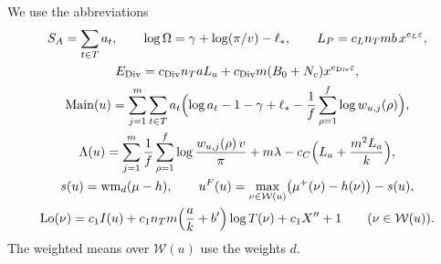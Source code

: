 \documentclass[11pt]{amsart}
\newcommand{\eps}{\varepsilon}
\theoremstyle{plain}
\theoremstyle{definition}
\numberwithin{equation}{section}
\begin{document}
We use the abbreviations
\begin{gather*}
S_A=\sum_{t\in T}a_t,\qquad \log\Omega=\gamma+\log(\pi/v)-\ell_\ast,\qquad
L_P=c_Ln_Tmb\,x^{e_L\eps},\\
E_{\mathrm{Div}}=c_{\mathrm{Div}}n_TaL_a+c_{\mathrm{Div}}m(B_0+N_c)x^{e_{\mathrm{Div}}\eps},\\
\mathrm{Main}(u)=\sum_{j=1}^m\sum_{t\in T}a_t\Bigl(\log a_t-1-\gamma+\ell_\ast-\frac1f\sum_{\rho=1}^f\log w_{u,j}(\rho)\Bigr),\\
\Lambda(u)=\sum_{j=1}^m\frac1f\sum_{\rho=1}^f\log\frac{w_{u,j}(\rho)\,v}{\pi}+m\lambda-c_C\Bigl(L_a+\frac{m^2L_a}{k}\Bigr),\\
s(u)=\mathrm{wm}_d(\mu-h),\qquad u^F(u)=\max_{\nu\in\mathcal W(u)}\bigl(\mu^+(\nu)-h(\nu)\bigr)-s(u),\\
\mathrm{Lo}(\nu)=c_1I(u)+c_1n_Tm\Bigl(\frac ak+b'\Bigr)\log T(\nu)+c_1X''+1\qquad(\nu\in\mathcal W(u)).
\end{gather*}
The weighted means over $\mathcal W(u)$ use the weights $d$.
\end{document}
